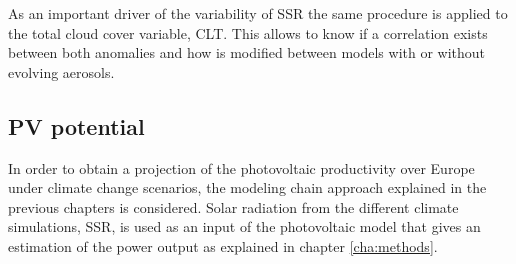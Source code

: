 
As an important driver of the variability of SSR the same procedure is applied to the total cloud cover variable, CLT. This allows to know if a correlation exists between both anomalies and how is modified between models with or without evolving aerosols.





\subsection{PV potential}

In order to obtain a projection of the photovoltaic productivity over Europe under climate change scenarios, the modeling chain approach explained in the previous chapters is considered. Solar radiation from the different climate simulations, SSR, is used as an input of the photovoltaic model that gives an estimation of the power output as explained in chapter \ref{cha:methods}.


